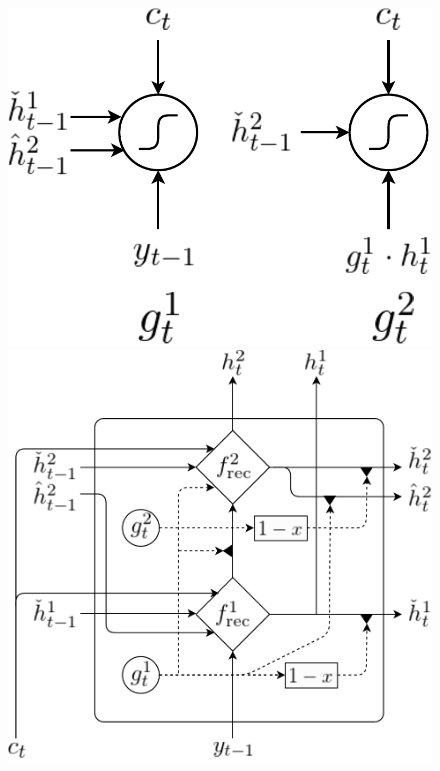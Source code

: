\documentclass[11pt]{article}
\begin{document}
\begin{figure}
    \begin{minipage}{1.\columnwidth}
        \begin{minipage}{0.46\columnwidth}
            \centering
            \includegraphics[width=1.\columnwidth]{CHDec_fig_1.pdf}
        \end{minipage}
        \hfill
        \begin{minipage}{0.46\columnwidth}
            \centering
            \includegraphics[width=1.\columnwidth]{CHDec_fig_2.pdf}

\end{minipage}
\end{minipage}
\end{figure}
\end{document}
